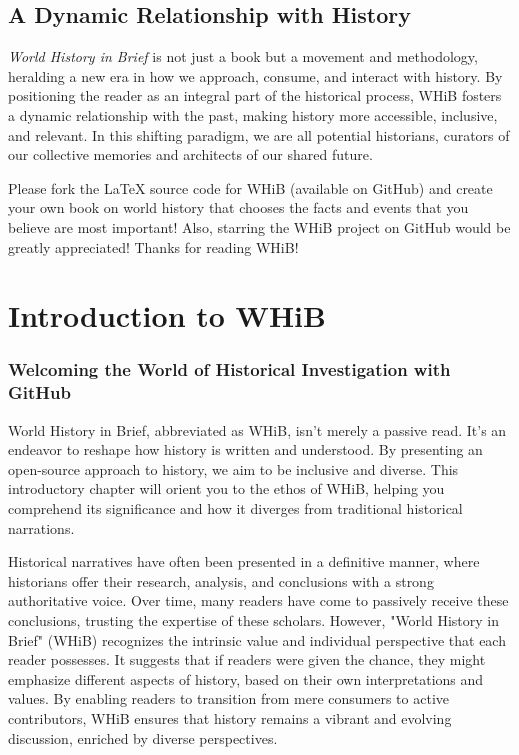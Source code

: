 \documentclass[a4paper,12pt]{book}
\begin{document}
\section*{A Dynamic Relationship with History}
\emph{World History in Brief} is not just a book but a movement and methodology, heralding a new era in how we approach, consume, and interact with history. By positioning the reader as an integral part of the historical process, WHiB fosters a dynamic relationship with the past, making history more accessible, inclusive, and relevant. In this shifting paradigm, we are all potential historians, curators of our collective memories and architects of our shared future.

Please fork the LaTeX source code for WHiB (available on GitHub) and create your own book on world history that chooses the facts and events that you believe are most important! Also, starring the WHiB project on GitHub would be greatly appreciated! Thanks for reading WHiB!

\chapter{Introduction to WHiB}
\subsection*{Welcoming the World of Historical Investigation with GitHub}
World History in Brief, abbreviated as WHiB, isn't merely a passive read. It's an endeavor to reshape how history is written and understood. By presenting an open-source approach to history, we aim to be inclusive and diverse. This introductory chapter will orient you to the ethos of WHiB, helping you comprehend its significance and how it diverges from traditional historical narrations.

Historical narratives have often been presented in a definitive manner, where historians offer their research, analysis, and conclusions with a strong authoritative voice. Over time, many readers have come to passively receive these conclusions, trusting the expertise of these scholars. However, "World History in Brief" (WHiB) recognizes the intrinsic value and individual perspective that each reader possesses. It suggests that if readers were given the chance, they might emphasize different aspects of history, based on their own interpretations and values. By enabling readers to transition from mere consumers to active contributors, WHiB ensures that history remains a vibrant and evolving discussion, enriched by diverse perspectives.
\end{document}
